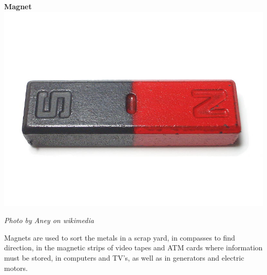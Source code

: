 \begin{minipage}{.5\textwidth}
\begin{center}
\textbf{Magnet}
 \includegraphics[width=.8\textwidth]{photos/magnet.jpg}\par
\textit{Photo by Aney on wikimedia}
\end{center}
\end{minipage}
      \label{m38706*id67200}Magnets are used to sort the metals in a scrap yard, in compasses to find direction, in the magnetic strips of video tapes and ATM cards where information must be stored, in computers and TV's, as well as in generators and electric motors.\par 
\label{m38706*secfhsst!!!underscore!!!id575}
